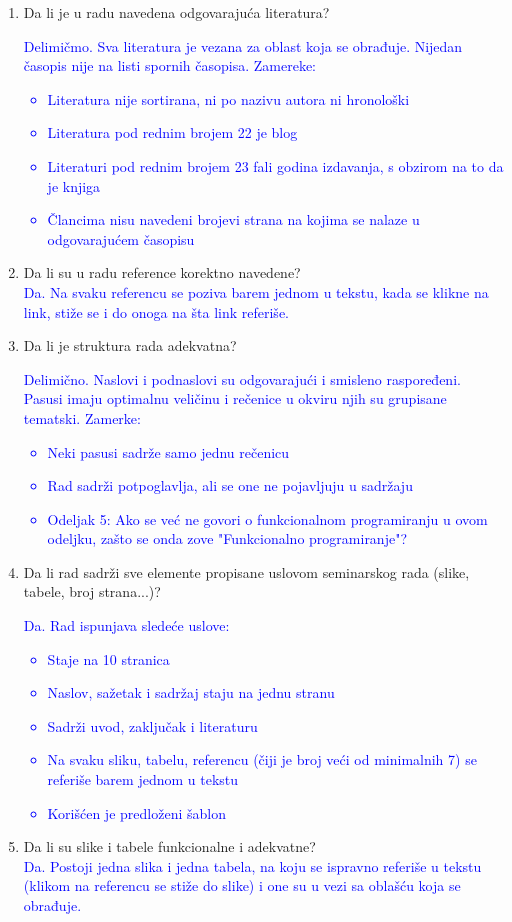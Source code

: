 \documentclass[a4paper]{report}
\newcommand{\odgovor}[1]{\textcolor{blue}{#1}}
\begin{document}
\begin{enumerate}
\item Da li je u radu navedena odgovarajuća literatura?\\
\odgovor{
Delimičmo. Sva literatura je vezana za oblast koja se obrađuje. Nijedan časopis nije na listi spornih časopisa.
Zamereke:
\begin{itemize}
    \item Literatura nije sortirana, ni po nazivu autora ni hronološki
    \item Literatura pod rednim brojem 22 je blog
    \item Literaturi pod rednim brojem 23 fali godina izdavanja, s obzirom na to da je knjiga
    \item Člancima nisu navedeni brojevi strana na kojima se nalaze u odgovarajućem časopisu
\end{itemize}
}

\item Da li su u radu reference korektno navedene?\\
\odgovor{
Da. Na svaku referencu se poziva barem jednom u tekstu, kada se klikne na link, stiže se i do onoga na šta link referiše.
}

\item Da li je struktura rada adekvatna?\\
\odgovor{
Delimično. Naslovi i podnaslovi su odgovarajući i smisleno raspoređeni. Pasusi imaju optimalnu veličinu i rečenice u okviru njih su grupisane tematski.
Zamerke:
\begin{itemize}
    \item Neki pasusi sadrže samo jednu rečenicu
    \item Rad sadrži potpoglavlja, ali se one ne pojavljuju u sadržaju
    \item Odeljak 5: Ako se već ne govori o funkcionalnom programiranju u ovom odeljku, zašto se onda zove "Funkcionalno programiranje"?
\end{itemize}
}

\item Da li rad sadrži sve elemente propisane uslovom seminarskog rada (slike, tabele, broj strana...)?\\
\odgovor{
Da. Rad ispunjava sledeće uslove:
\begin{itemize}
    \item Staje na 10 stranica
    \item Naslov, sažetak i sadržaj staju na jednu stranu
    \item Sadrži uvod, zaključak i literaturu
    \item Na svaku sliku, tabelu, referencu (čiji je broj veći od minimalnih 7) se referiše barem jednom u tekstu
    \item Korišćen je predloženi šablon
\end{itemize}
}

\item Da li su slike i tabele funkcionalne i adekvatne?\\
\odgovor{
Da. Postoji jedna slika i jedna tabela, na koju se ispravno referiše u tekstu (klikom na referencu se stiže do slike) i one su u vezi sa oblašću koja se obrađuje.
}
\end{enumerate}
\end{document}
